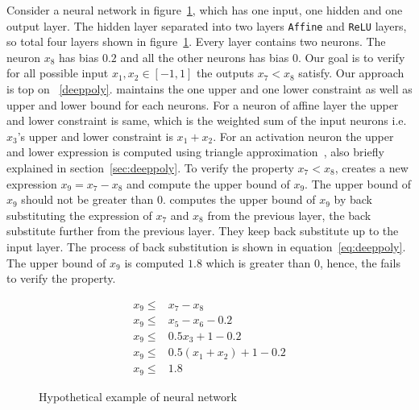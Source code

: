 Consider a neural network in figure~\ref{fig:motivating}, 
which has one input, one hidden and one output layer. The hidden layer separated into two layers 
\texttt{Affine} and \texttt{ReLU} layers, so total four layers shown in figure~\ref{fig:motivating}. 
Every layer contains two neurons. The neuron $x_8$ has bias $0.2$ and all the other neurons has bias $0$. 
Our goal is to verify for all possible input $x_1,x_2 \in [-1,1]$ the outputs $x_7 < x_8$ satisfy. 
Our approach is top on \deeppoly{}~\ref{deeppoly}. \deeppoly{} maintains the one upper and one lower constraint
as well as upper and lower bound for each neurons. For a neuron of affine layer the upper and lower constraint is 
same, which is the weighted sum of the input neurons i.e. $x_3$'s upper and lower constraint is $x_1+x_2$. 
For an activation neuron the upper and lower expression is computed using triangle approximation~\cite{deeppoly}, 
also briefly explained in section~\ref{sec:deeppoly}. To verify the property $x_7 < x_8$, \deeppoly{} creates a 
new expression $x_9 = x_7 - x_8$ and compute the upper bound of $x_9$. The upper bound of $x_9$ should not be greater
than $0$. \deeppoly{} computes the upper bound of $x_9$ by back substituting the expression of $x_7$ and $x_8$ 
from the previous layer, the back substitute further from the previous layer. They keep back substitute 
up to the input layer. The process of back substitution is shown in equation~\ref{eq:deeppoly}.
The upper bound of $x_9$ is computed $1.8$ which is greater than $0$, hence, the \deeppoly{} fails to verify the property. 


\begin{equation}
    \begin{aligned}
        x_9 \leq  &  x_7 - x_8 \\
        x_9 \leq  & x_5 - x_6 - 0.2 \\
        x_9 \leq  & 0.5x_3 + 1 - 0.2 \\
        x_9 \leq  & 0.5(x_1+x_2) + 1 -0.2 \\
        x_9 \leq  & 1.8
    \end{aligned}
\label{eq:deeppoly}
\end{equation}



\begin{figure}[!ht]
	\centering
	\scalebox{0.8}{}
	\caption{Hypothetical example of neural network}
	\label{fig:motivating}
\end{figure}
